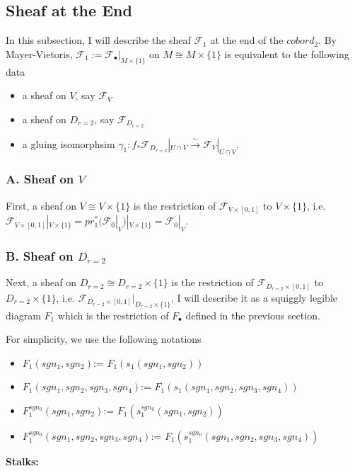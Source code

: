 \subsection{Sheaf at the End}
In this subsection, I will describe the sheaf $\mathscr{F}_1$ at the end of the $cobord_2$. By Mayer-Vietoris, $\mathscr{F}_1:= \mathscr{F}_\bullet|_{M\times\{1\}}$ on $M \cong M\times\{1\}$ is equivalent to the following data
\begin{itemize}
\item a sheaf on $V$, say $\mathscr{F}_{V}$

\item a sheaf on $D_{r=2}$, say $\mathscr{F}_{D_{r=2}}$

\item a gluing isomorphsim $\gamma_1 : f_*\mathscr{F}_{D_{r=2}}|_{U\cap V} \xrightarrow{\sim} \mathscr{F}_{V}|_{U\cap V}$.
\end{itemize}

\subsubsection{A. Sheaf on $V$}
First, a sheaf on $V\cong V\times\{1\}$ is the restriction of $\mathscr{F}_{V\times [0,1]}$ to $V\times \{1\}$, i.e. $\mathscr{F}_{V\times [0,1]}|_{V\times \{1\}}= pr_1^*(\mathscr{F}_0|_V)|_{V\times \{1\}} = \mathscr{F}_0|_V$.
\subsubsection{B. Sheaf on $D_{r=2}$}
Next, a sheaf on $D_{r=2}\cong D_{r=2}\times \{1\}$ is the restriction of $\mathscr{F}_{D_{r=2}\times [0,1]}$ to $D_{r=2}\times \{1\}$, i.e. $\mathscr{F}_{D_{r=2}\times [0,1]} |_{D_{r=2}\times \{1\}}$. I will describe it as a squiggly legible diagram $F_1$ which is the restriction of $F_\bullet$ defined in the previous section.

For simplicity, we use the following notations
\begin{itemize}
\item $F_1(sgn_1,sgn_2)$:= $F_1(s_1(sgn_1,sgn_2))$
\item $F_1(sgn_1,sgn_2,sgn_3,sgn_4)$:= $F_1(s_1(sgn_1,sgn_2,sgn_3,sgn_4))$
\item $F_1^{sgn_0}(sgn_1,sgn_2)$:= $F_1(s_1^{sgn_0}(sgn_1,sgn_2))$
\item $F_1^{sgn_0}(sgn_1,sgn_2,sgn_3,sgn_4)$:= $F_1(s_1^{sgn_0}(sgn_1,sgn_2,sgn_3,sgn_4))$
\end{itemize}
\textbf{Stalks:}

